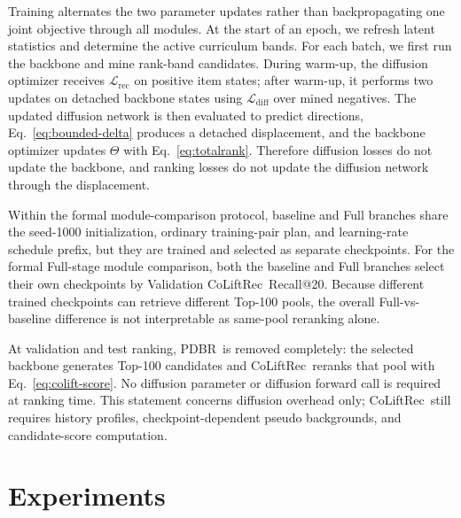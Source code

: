 \documentclass[sigconf,anonymous,review]{acmart}
\newcommand{\methodname}{CoLiftRec}
\newcommand{\pdbr}{PDBR}
\begin{document}
Training alternates the two parameter updates rather than backpropagating one joint objective through all modules.
At the start of an epoch, we refresh latent statistics and determine the active curriculum bands.
For each batch, we first run the backbone and mine rank-band candidates.
During warm-up, the diffusion optimizer receives $\mathcal{L}_{\mathrm{rec}}$ on positive item states; after warm-up, it performs two updates on detached backbone states using $\mathcal{L}_{\mathrm{diff}}$ over mined negatives.
The updated diffusion network is then evaluated to predict directions, Eq.~\eqref{eq:bounded-delta} produces a detached displacement, and the backbone optimizer updates $\Theta$ with Eq.~\eqref{eq:totalrank}.
Therefore diffusion losses do not update the backbone, and ranking losses do not update the diffusion network through the displacement.

Within the formal module-comparison protocol, baseline and Full branches share the seed-1000 initialization, ordinary training-pair plan, and learning-rate schedule prefix, but they are trained and selected as separate checkpoints.
For the formal Full-stage module comparison, both the baseline and Full branches select their own checkpoints by Validation \methodname\ Recall@20.
Because different trained checkpoints can retrieve different Top-100 pools, the overall Full-vs-baseline difference is not interpretable as same-pool reranking alone.

At validation and test ranking, \pdbr\ is removed completely: the selected backbone generates Top-100 candidates and \methodname\ reranks that pool with Eq.~\eqref{eq:colift-score}.
No diffusion parameter or diffusion forward call is required at ranking time.
This statement concerns diffusion overhead only; \methodname\ still requires history profiles, checkpoint-dependent pseudo backgrounds, and candidate-score computation.

\section{Experiments}
\label{sec:experiments}
\end{document}
